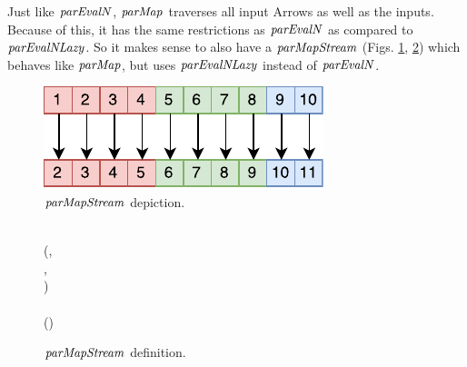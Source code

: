 \documentclass[paper=A4,twoside=true,openright,parskip=full,chapterprefix=true,headings=normal,bibliography=totoc,listof=totoc,titlepage=on,captions=tableabove,draft=false,british]{scrreprt}%
\begin{document}
Just like \ensuremath{\Varid{parEvalN}}, \ensuremath{\Varid{parMap}} traverses all input Arrows as well as the
inputs. Because of this, it has the same restrictions as \ensuremath{\Varid{parEvalN}} as
compared to \ensuremath{\Varid{parEvalNLazy}}. So it makes sense to also have a
\ensuremath{\Varid{parMapStream}} (Figs. \ref{fig:parMapStreamImg}, \ref{fig:parMapStream})
which behaves like \ensuremath{\Varid{parMap}}, but uses \ensuremath{\Varid{parEvalNLazy}} instead of
\ensuremath{\Varid{parEvalN}}.

\vfill

\begin{figure}[h]
\centering
\includegraphics{src/img/parMapStream.pdf}
\caption{\ensuremath{\Varid{parMapStream}} depiction.\label{fig:parMapStreamImg}}
\end{figure}

\begin{figure}[h]
\centering
\begin{hscode}\SaveRestoreHook
{}%
%
%
\>[B]{}\;\mathrel{=}\<[E]%
\\[\blanklineskip]%
\>[B]{}\mathbin{::}(\;\;\;\;,{}\<[E]%
\\
\>[B]{}\<[5]%
\>[5]{}\;,{}\<[E]%
\\
\>[B]{}\<[5]%
\>[5]{}\;)\Rightarrow {}\<[E]%
\\
\>[B]{}\<[5]%
\>[5]{}\to {}\to {}\;\;\to {}\<[E]%
\\
\>[B]{}\;\;\;\mathrel{=}\;\;\;(\;){}\<[E]%
\ColumnHook
\end{hscode}\resethooks
\caption{\ensuremath{\Varid{parMapStream}} definition.}\label{fig:parMapStream}\end{figure}
\end{document}
